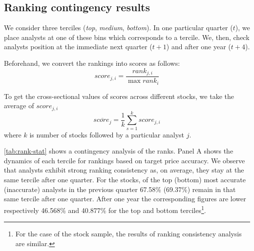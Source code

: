 \documentclass[a4paper,12pt,openright,notitlepage]{report}\usepackage[]{graphicx}\usepackage[]{color}
\begin{document}
\subsection{Ranking contingency results}
\label{ch1-tab:rank-contin}
We consider  three terciles (\textit{top}, \textit{medium}, \textit{bottom}). In one particular quarter ($t$), we place  analysts at one of these bins which corresponds to a tercile. We, then,  check analysts position at the immediate next quarter ($t+1$) and after one year ($t+4$).

Beforehand, we convert the rankings into scores as follows:
\begin{equation}
\label{eq:score}
score_{j,i}=\frac{rank_{j,i}}{\max{rank_i}}
\end{equation}

To get the cross-sectional values of scores across different stocks, we take the average of $score_{j,i}$
\begin{equation}
\label{eq:mean-score}
\overline{score_{j}}= \frac{1}{k} \sum_{s=1}^{k} score_{j,i}
\end{equation}
where $k$ is number of stocks followed by a particular analyst $j$.

\ref{tab:rank-stat} shows a contingency analysis of the ranks.
Panel A shows the dynamics of each tercile for rankings based on target price  accuracy. We observe that analysts exhibit strong ranking consistency as, on average, they stay at the same tercile after one quarter. For the \all{} stocks,  of the top (bottom) most accurate (inaccurate) analysts in the previous quarter 67.58\% (69.37\%) remain in that same tercile after one quarter. After one year the corresponding figures are lower respectively 46.568\% and 40.877\% for the top and bottom terciles\footnote{For the case of the \same{} stock sample, the results of ranking consistency analysis are similar.}.
\end{document}
